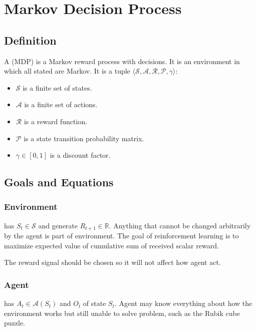 
%
%

\section{Markov Decision Process}

\subsection{Definition}

A  (MDP) is a Markov reward process with decisions. It is an environment in which all stated are Markov. It is a tuple $\langle \mathcal{S}, \mathcal{A}, \mathcal{R}, \mathcal{P}, \gamma \rangle$:

\begin{itemize}
	\item $\mathcal{S}$ is a finite set of states.
	\item $\mathcal{A}$ is a finite set of actions.
	\item $\mathcal{R}$ is a reward function.
	\item $\mathcal{P}$ is a state transition probability matrix.
	\item $\gamma \in [0,1]$ is a discount factor.
\end{itemize}

\subsection{Goals and Equations}

\subsubsection{Environment}

 has  $S_t \in \mathcal{S}$ and generate  $R_{t+1} \in \mathbb{R}$. Anything that cannot be changed arbitrarily by the agent is part of environment. The goal of reinforcement learning is to maximize expected value of cumulative sum of received scalar reward.

The reward signal should be chosen so it will not affect how agent act.

\subsubsection{Agent}

 has  $A_t \in \mathcal{A}(S_t)$ and  $O_t$ of state $S_t$. Agent may know everything about how the environment works but still unable to solve problem, such as the Rubik cube puzzle.

